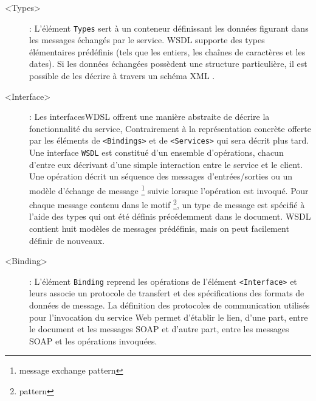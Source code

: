 	 \cite{baryannis2010}
	 \cite{elie2010}
	 \cite{lopez2008selection}
	\renewcommand{\descriptionlabel}[1]{\hspace{1.5cm}\texttt{#1}} 
	\begin{description} %

	    \item[<Types>]: 
		L'élément \texttt{Types} sert à un conteneur définissant les données figurant dans les messages 
		échangés par le service. \textsc{WSDL} supporte des types élémentaires prédéfinis (tels que les entiers,
	       	les chaînes de caractères et les dates). Si les données échangées possèdent une structure particulière, 
		il est possible de les décrire à travers un schéma XML \cite{part20012}.
		
	    \item[<Interface>]:
		Les interfaces\textsc{WDSL} offrent une manière abstraite de décrire la fonctionnalité du service,
		Contrairement à la représentation concrète offerte par les éléments de \texttt{<Bindings>} et 
		de \texttt{<Services>} qui sera décrit plus tard. 
		Une interface \texttt{WSDL} est constitué d'un ensemble d'opérations, chacun d'entre eux décrivant 
		d'une simple interaction entre le service et le client. Une opération décrit un séquence des messages
		d'entrées/sorties ou un modèle d'échange de message \footnote{message exchange pattern} suivie lorsque
		l'opération est invoqué. Pour chaque message contenu dans le motif \footnote{pattern},
	       	un type de message est spécifié à l'aide des types qui ont été définis précédemment dans le document. 
		\textsc{WSDL} contient huit modèles de messages prédéfinis, mais on peut facilement définir de nouveaux.
	    \item[<Binding>]: \cite{elie2010} \cite{baryannis2010}
		L'élément \texttt{Binding} reprend les opérations de l'élément \texttt{<Interface>} et leurs associe 
		un protocole de transfert et des spécifications des formats de données de message.  
		La définition des protocoles de communication utilisés pour l'invocation du service Web permet 
		d'établir le lien, d'une part, entre le document et les messages \textsc{SOAP} et d'autre part,
	       	entre les messages \textsc{SOAP} et les opérations invoquées.  



\end{description}
